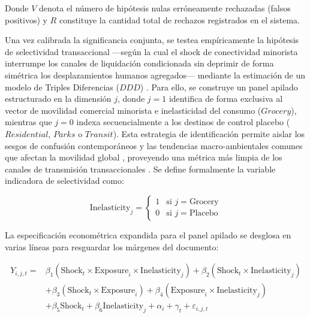 Donde $V$ denota el n\'umero de hip\'otesis nulas err\'oneamente rechazadas (falsos positivos) y $R$ constituye la cantidad total de rechazos registrados en el sistema.

Una vez calibrada la significancia conjunta, se testea emp\'iricamente la hip\'otesis de selectividad transaccional ---seg\'un la cual el shock de conectividad minorista interrumpe los canales de liquidaci\'on condicionada sin deprimir de forma sim\'etrica los desplazamientos humanos agregados--- mediante la estimaci\'on de un modelo de Triples Diferencias ($DDD$) \citep{gruber1994incidence, meyer1995natural}. Para ello, se construye un panel apilado estructurado en la dimensi\'on $j$, donde $j=1$ identifica de forma exclusiva al vector de movilidad comercial minorista e inelasticidad del consumo ($Grocery$), mientras que $j=0$ indexa secuencialmente a los destinos de control placebo ($Residential$, $Parks$ o $Transit$). Esta estrategia de identificaci\'on permite aislar los sesgos de confusi\'on contempor\'aneos y las tendencias macro-ambientales comunes que afectan la movilidad global \citep{wooldridge2011econometric}, proveyendo una m\'etrica m\'as limpia de los canales de transmisi\'on transaccionales \citep{chetty2009sufficient}. Se define formalmente la variable indicadora de selectividad como:

\begin{equation}
    \text{Inelasticity}_j = \begin{cases} 1 & \text{si } j = \text{Grocery} \\ 0 & \text{si } j = \text{Placebo} \end{cases}
\end{equation}

La especificaci\'on econom\'etrica expandida para el panel apilado se desglosa en varias l\'ineas para resguardar los m\'argenes del documento:

\begin{equation}
\begin{aligned}
    Y_{i,j,t} = & \beta_1 \left( \text{Shock}_t \times \text{Exposure}_i \times \text{Inelasticity}_j \right) + \beta_2 \left( \text{Shock}_t \times \text{Inelasticity}_j \right) \\
    & + \beta_3 \left( \text{Shock}_t \times \text{Exposure}_i \right) + \beta_4 \left( \text{Exposure}_i \times \text{Inelasticity}_j \right) \\
    & + \beta_5 \text{Shock}_t + \beta_6 \text{Inelasticity}_j + \alpha_i + \gamma_t + \varepsilon_{i,j,t}
\end{aligned}
\label{eq:triple_interaction}
\end{equation}


